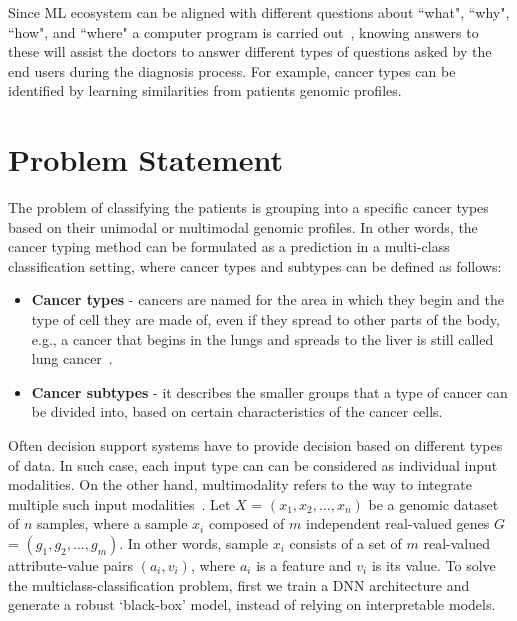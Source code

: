 \hspace*{3.5mm} Since ML ecosystem can be aligned with different questions about ``what", ``why", ``how", and ``where" a computer program is carried out~\cite{zednik2019solving}, knowing answers to these will assist the doctors to answer different types of questions asked by the end users during the diagnosis process. For example, cancer types can be identified by learning similarities from patients genomic profiles.   

\section{Problem Statement} \label{problem_challenges}
The problem of classifying the patients is grouping into a specific cancer types based on their unimodal or multimodal genomic profiles. In other words, the cancer typing method can be formulated as a prediction in a multi-class classification setting, where cancer types and subtypes can be defined as follows: %

\begin{itemize}[noitemsep]
    \item \textbf{Cancer types} - cancers are named for the area in which they begin and the type of cell they are made of, even if they spread to other parts of the body, e.g., a cancer that begins in the lungs and spreads to the liver is still called lung cancer~\cite{19Cruz}. 
    \item \textbf{Cancer subtypes} - it describes the smaller groups that a type of cancer can be divided into, based on certain characteristics of the cancer cells.  %
\end{itemize}

\hspace*{3.5mm} Often decision support systems have to provide decision based on different types of data. In such case, each input type can can be considered as individual input modalities. On the other hand, multimodality refers to the way to integrate multiple such input modalities~\cite{mmsurvey}. Let $X$ = $\left(x_{1}, x_{2}, \ldots, x_{n}\right)$ be a genomic dataset of $n$ samples, where a sample $x_i$ composed of $m$ independent real-valued genes $G$ = $\left(g_{1}, g_{2}, \ldots, g_{m}\right)$. %
In other words, sample $x_i$ consists of a set of $m$ real-valued attribute-value pairs $\left(a_{i}, v_{i}\right)$, where $a_i$ is a feature and $v_i$ is its value.
To solve the multiclass-classification problem, first we train a DNN architecture and generate a robust `black-box' model, instead of relying on interpretable models. 

